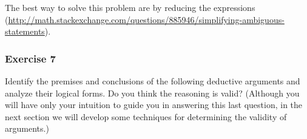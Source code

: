 \begin{questions}

\begin{solution}
The best way to solve this problem are by reducing the
expressions (\url{http://math.stackexchange.com/questions/885946/simplifying-ambiguous-statements}).
\end{solution}



\subsubsection{Exercise 7}

\question Identify the premises and conclusions of the following deductive arguments and analyze their logical forms. Do you think the reasoning is valid?
(Although you will have only your intuition to guide you in answering
this last question, in the next section we will develop some techniques for
determining the validity of arguments.)

\end{questions}
